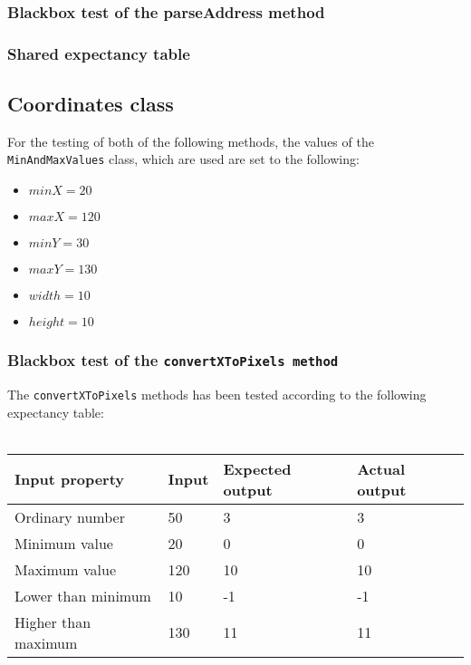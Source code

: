 \documentclass[a4paper,11pt]{article}
\begin{document}
\subsubsection{Blackbox test of the parseAddress method}


\subsubsection{Shared expectancy table}

\pagebreak
\subsection{Coordinates class}
For the testing of both of the following methods, the values of the \texttt{MinAndMaxValues} class, which are used are set to the following:
\begin{itemize}
	\item $minX = 20$
	\item $maxX = 120$
	\item $minY = 30$
	\item $maxY = 130$
	\item $width = 10$
	\item $height = 10$
\end{itemize}

\subsubsection{Blackbox test of the \texttt{convertXToPixels method}}
The \texttt{convertXToPixels} methods has been tested according to the following expectancy table: \\ \\
\begin{tabular}{ p{3.5cm} | p{2.5cm} | p{2.5cm} | p{2.5cm} }
	Input property & Input & Expected output & Actual output \\
	\hline
	Ordinary number & 50 & 3 & 3 \\
	Minimum value & 20 & 0 & 0 \\
	Maximum value & 120 & 10 & 10 \\
	Lower than minimum & 10 & -1 & -1 \\
	Higher than maximum & 130 & 11 & 11
\end{tabular}
\end{document}
